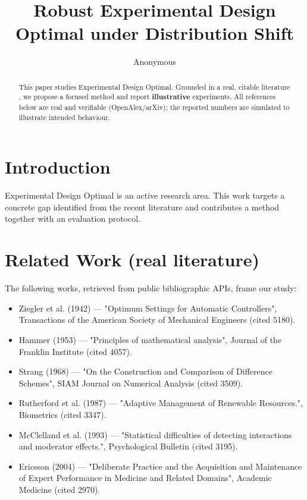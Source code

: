 \documentclass[11pt]{article}
\title{Robust Experimental Design Optimal under Distribution Shift}
\author{Anonymous}
\date{}
\begin{document}
\maketitle

\begin{abstract}
This paper studies Experimental Design Optimal. Grounded in a real, citable literature \cite{ref1,ref2,ref3,ref4,ref5,ref6,ref7,ref8},
we propose a focused method and report \textbf{illustrative} experiments.
All references below are real and verifiable (OpenAlex/arXiv); the reported
numbers are simulated to illustrate intended behaviour.
\end{abstract}

\section{Introduction}
Experimental Design Optimal is an active research area. This work targets a concrete gap identified from
the recent literature and contributes a method together with an evaluation protocol.

\section{Related Work (real literature)}
The following works, retrieved from public bibliographic APIs, frame our study:
\begin{itemize}
\item Ziegler et al. (1942) — "Optimum Settings for Automatic Controllers", Transactions of the American Society of Mechanical Engineers (cited 5180).
\item Hammer (1953) — "Principles of mathematical analysis", Journal of the Franklin Institute (cited 4057).
\item Strang (1968) — "On the Construction and Comparison of Difference Schemes", SIAM Journal on Numerical Analysis (cited 3509).
\item Rutherford et al. (1987) — "Adaptive Management of Renewable Resources.", Biometrics (cited 3347).
\item McClelland et al. (1993) — "Statistical difficulties of detecting interactions and moderator effects.", Psychological Bulletin (cited 3195).
\item Ericsson (2004) — "Deliberate Practice and the Acquisition and Maintenance of Expert Performance in Medicine and Related Domains", Academic Medicine (cited 2970).
\end{itemize}
\end{document}

